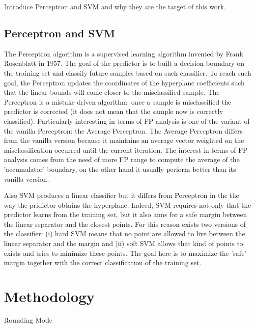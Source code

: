 \documentclass[sigplan,review,anonymous=false]{acmart}\settopmatter{printfolios=true,printccs=false,printacmref=false}
\begin{document}
Introduce Perceptron and SVM and why they are the target of this work.

\subsection{Perceptron and SVM}
The Perceptron algorithm is a supervised learning algorithm invented by Frank Rosenblatt in 1957\cite{perceptron}. The goal of the predictor is to built a decision boundary on the training set and classify future samples based on such classifier. To reach such goal, the Perceptron updates the coordinates of the hyperplane coefficients such that the linear bounds will come closer to the misclassified sample. 
The Perceptron is a mistake driven algorithm: once a sample is misclassified the predictor is corrected (it does not mean that the sample now is correctly classified).
Particularly interesting in terms of FP analysis is one of the variant of the vanilla Perceptron: the Average Perceptron. 
The Average Perceptron differs from the vanilla version because it maintains an average vector weighted on the misclassification occurred until the current iteration. 
The interest in terms of FP analysis comes from the need of more FP range to compute the average of the 'accumulator' boundary, on the other hand it usually perform better than its vanilla version.

Also SVM produces a linear classifier but it differs from Perceptron in the the way the pridictor obtains the hyperplane. Indeed, SVM requires not only that the predictor learns from the training set, but it also aims for a safe margin between the linear separator and the closest points. For this reason exists two versions of the classifier: (i) hard SVM means that no point are allowed to live between the linear separator and the margin and (ii) soft SVM allows that kind of points to exists and tries to minimize these points. The goal here is to maximize the 'safe' margin together with the correct classification of the training set.

\section{Methodology}

Rounding Mode
\end{document}
